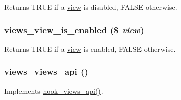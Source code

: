 \label{views_8module_afba08d9328467943ebfec0a583ecb214}
Returns TRUE if a \hyperlink{classview}{view} is disabled, FALSE otherwise. \hypertarget{views_8module_a2d707888904ef7d6d0c54ff7802f8cd9}{
\subsubsection[{views\_\-view\_\-is\_\-enabled}]{\setlength{\rightskip}{0pt plus 5cm}views\_\-view\_\-is\_\-enabled (\$ {\em view})}}
\label{views_8module_a2d707888904ef7d6d0c54ff7802f8cd9}
Returns TRUE if a \hyperlink{classview}{view} is enabled, FALSE otherwise. \hypertarget{views_8module_a907c76d0314986d60f7e2361243eaa5d}{
\subsubsection[{views\_\-views\_\-api}]{\setlength{\rightskip}{0pt plus 5cm}views\_\-views\_\-api ()}}
\label{views_8module_a907c76d0314986d60f7e2361243eaa5d}
Implements \hyperlink{group__views__hooks_gac67ffd4a2f61f9814ee37b541c472c47}{hook\_\-views\_\-api()}.


